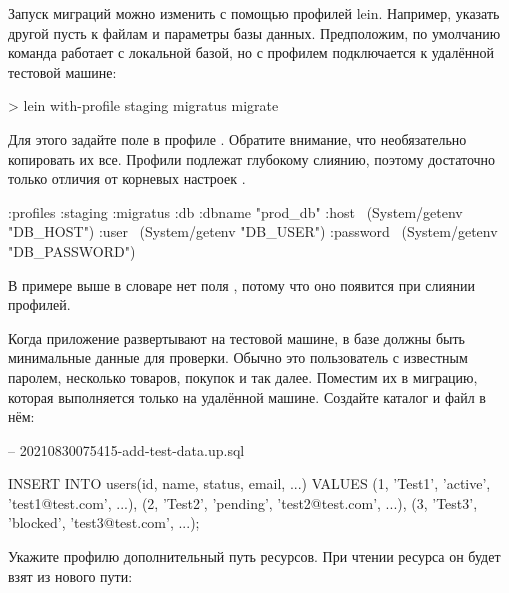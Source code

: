 Запуск миграций можно изменить с помощью профилей lein. Например, указать другой пусть к файлам и параметры базы данных. Предположим, по умолчанию команда  работает с локальной базой, но с профилем  подключается к удалённой тестовой машине:

\begin{english}
  \begin{bash}
> lein with-profile staging migratus migrate
  \end{bash}
\end{english}

Для этого задайте поле  в профиле . Обратите внимание, что необязательно копировать их все. Профили  подлежат глубокому слиянию, поэтому достаточно только отличия от корневых настроек .

\begin{english}
  \begin{clojure}
{:profiles
 {:staging
  {:migratus
   {:db
     {:dbname "prod_db"
      :host ~(System/getenv "DB_HOST")
      :user ~(System/getenv "DB_USER")
      :password ~(System/getenv "DB_PASSWORD")}}}}}
  \end{clojure}
\end{english}

В примере выше в словаре  нет поля , потому что оно появится при слиянии профилей.

Когда приложение развертывают на тестовой машине, в базе должны быть минимальные данные для проверки. Обычно это пользователь с известным паролем, несколько товаров, покупок и так далее. Поместим их в миграцию, которая выполняется только на удалённой машине. Создайте каталог  и файл в нём:

\begin{english}
  \begin{sql}
-- 20210830075415-add-test-data.up.sql

INSERT INTO users(id, name, status, email, ...)
VALUES
 (1, 'Test1', 'active',  'test1@test.com', ...),
 (2, 'Test2', 'pending', 'test2@test.com', ...),
 (3, 'Test3', 'blocked', 'test3@test.com', ...);
  \end{sql}
\end{english}

Укажите профилю  дополнительный путь ресурсов. При чтении ресурса  он будет взят из нового пути:

